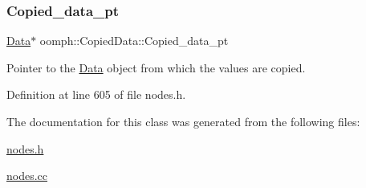 \subsubsection{\texorpdfstring{Copied\+\_\+data\+\_\+pt}{Copied\_data\_pt}}
{\footnotesize\ttfamily \hyperlink{classoomph_1_1Data}{Data}$\ast$ oomph\+::\+Copied\+Data\+::\+Copied\+\_\+data\+\_\+pt\hspace{0.3cm}{\ttfamily [private]}}



Pointer to the \hyperlink{classoomph_1_1Data}{Data} object from which the values are copied. 



Definition at line 605 of file nodes.\+h.



The documentation for this class was generated from the following files\+:\begin{DoxyCompactItemize}
\item 
\hyperlink{nodes_8h}{nodes.\+h}\item 
\hyperlink{nodes_8cc}{nodes.\+cc}\end{DoxyCompactItemize}
